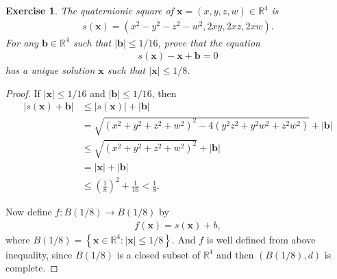 \documentclass[11pt]{article}
\newtheorem{exercise}{Exercise}[section]
\theoremstyle{definition}
\numberwithin{equation}{subsection}
\begin{document}
\medskip

\begin{exercise}{\rm *}
The quaternionic square of $\mathbf{x} = (x,y,z,w) \in \mathbb{R}^4$ is 
\begin{align*}
    s(\mathbf{x}) = \left( x^2 - y^2 - z^2 - w^2, 2xy, 2xz, 2xw \right).
\end{align*}
For any $\mathbf{b} \in \mathbb{R}^4$ such that $|\mathbf{b}| \leq 1/16$, prove that the equation
\begin{align*}
    s(\mathbf{x}) - \mathbf{x} + \mathbf{b} = 0
\end{align*}
has a unique solution $\mathbf{x}$ such that $|\mathbf{x}| \leq 1/8$.
\end{exercise}
\begin{proof}
If $|\mathbf{x}| \leq 1/16$  and $|\mathbf{b}| \leq 1/16$, then 
\begin{align*}
    |s(\mathbf{x}) + \mathbf{b}| & \leq |s(\mathbf{x})| + |\mathbf{b}| \\
    & = \sqrt{(x^2 + y^2 + z^2 + w^2)^2 - 4(y^2z^2 + y^2w^2 + z^2w^2)} + |\mathbf{b}| \\
    & \leq \sqrt{(x^2 + y^2 + z^2 + w^2)^2} + |\mathbf{b}| \\
    & = |\mathbf{x}| + |\mathbf{b}| \\
    & \leq \left(\frac{1}{8}\right)^2 + \frac{1}{16} < \frac{1}{8}.
\end{align*}

Now define $f:B(1/8) \to B(1/8)$ by
\begin{align*}
    f(\mathbf{x}) = s(\mathbf{x}) + b,
\end{align*}
where $B(1/8) = \left\{ \mathbf{x} \in \mathbb{R}^4 : |\mathbf{x}| \leq 1/8 \right\}$. And $f$ is well defined from above inequality, since $B(1/8)$ is a closed subset of $\mathbb{R}^4$ and then $(B(1/8), d)$ is complete. 


\end{proof}
\end{document}
